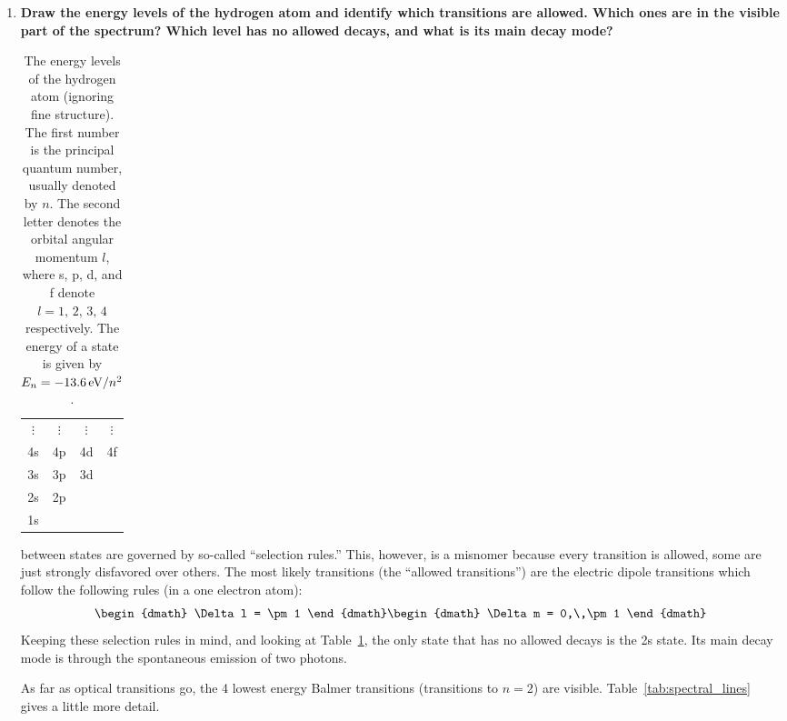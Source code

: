 \begin{enumerate}
      
\item \textbf{Draw the energy levels of the hydrogen atom and identify which transitions are
      allowed. Which ones are in the visible part of the spectrum? Which level has no
      allowed decays, and what is its main decay mode?}

      \begin{table}[ht]
      \begin{tabular}{cccc}
      $\vdots$ & $\vdots$ & $\vdots$ & $\vdots$ \\
      4s & 4p & 4d & 4f \\
      3s & 3p & 3d &\\
      2s & 2p &&\\
      1s &&&\\
      \end{tabular}
      \caption{The energy levels of the hydrogen atom (ignoring fine structure).  The first
               number is the principal quantum number, usually denoted by $n$.  The second letter
               denotes the orbital angular momentum $l$, where s, p, d, and f denote
               $l=1,\,2,\,3,\,4$ respectively.  The energy of a state is given by
               $E_n = -13.6\,{\rm eV}/n^2$.}
      \label{tab:hydrogen_energy_levels}
      \end{table}

      between states are governed by so-called ``selection rules.''
      This, however, is a misnomer because every transition is allowed, some are just strongly
      disfavored over others.  The most likely transitions (the ``allowed transitions'') are
      the electric dipole transitions which follow the following rules (in a one electron atom):
      \begin{dgroup}
      \begin{dmath}
        \Delta l = \pm 1
      \end{dmath}
      \begin{dmath}
        \Delta m = 0,\,\pm1
      \end{dmath}
      \end{dgroup}
      Keeping these selection rules in mind, and looking at Table~\ref{tab:hydrogen_energy_levels},
      the only state that has no allowed decays is the 2s state.  Its main decay mode is through
      the spontaneous emission of two photons.
      
      As far as optical transitions go, the 4 lowest energy Balmer transitions (transitions
      to $n=2$) are visible.  Table~\ref{tab:spectral_lines} gives a little more detail.

\end{enumerate}

